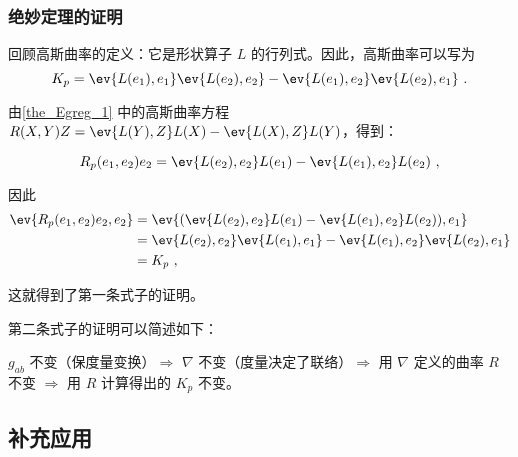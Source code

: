 \subsubsection{绝妙定理的证明}

回顾高斯曲率的定义：它是形状算子 $L$ 的行列式。因此，高斯曲率可以写为
\begin{equation}
K_p=\ev{L(e_1), e_1}\ev{L(e_2), e_2}-\ev{L(e_1), e_2}\ev{L(e_2), e_1}~.
\end{equation}

由\autoref{the_Egreg_1} 中的高斯曲率方程 $R(X, Y)Z=\ev{L(Y), Z}L(X)-\ev{L(X), Z}L(Y)$，得到：

\begin{equation}
R_p(e_1, e_2)e_2=\ev{L(e_2), e_2}L(e_1)-\ev{L(e_1), e_2}L(e_2)~,
\end{equation}

因此
\begin{equation}
\begin{aligned}
\ev{R_p(e_1, e_2)e_2, e_2}&=\ev{(\ev{L(e_2), e_2}L(e_1)-\ev{L(e_1), e_2}L(e_2)), e_1}\\
&=\ev{L(e_2), e_2}\ev{L(e_1), e_1}-\ev{L(e_1), e_2}\ev{L(e_2), e_1}\\
&=K_p~,
\end{aligned}
\end{equation}

这就得到了第一条式子的证明。

第二条式子的证明可以简述如下：

$g_{ab}$ 不变（保度量变换）$\Rightarrow$ $\nabla$ 不变（度量决定了联络）$\Rightarrow$ 用 $\nabla$ 定义的曲率 $R$ 不变 $\Rightarrow$ 用 $R$ 计算得出的 $K_p$ 不变。



\subsection{补充应用}



